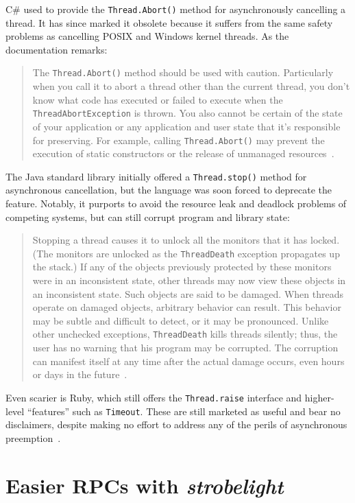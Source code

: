 C\# used to provide the \texttt{Thread.Abort()} method for asynchronously cancelling
a thread.  It has since marked it obsolete because it suffers from the same safety
problems as cancelling POSIX and Windows kernel threads.  As the documentation
remarks:
\begin{quote}
The \texttt{Thread.Abort()} method should be used with caution.  Particularly when
you call it to abort a thread other than the current thread, you don't know what code
has executed or failed to execute when the \texttt{ThreadAbortException} is thrown.
You also cannot be certain of the state of your application or any application and
user state that it's responsible for preserving.  For example, calling
\texttt{Thread.Abort()} may prevent the execution of static constructors or the
release of unmanaged resources~\cite{www-csharp-abort}.
\end{quote}

The Java standard library initially offered a \texttt{Thread.stop()} method for
asynchronous cancellation, but the language was soon forced to deprecate the feature.
Notably, it purports to avoid the resource leak and deadlock problems of competing
systems, but can still corrupt program and library state:
\begin{quote}
Stopping a thread causes it to unlock all the monitors that it has locked.  (The
monitors are unlocked as the \texttt{ThreadDeath} exception propagates up the stack.)
If any of the objects previously protected by these monitors were in an inconsistent
state, other threads may now view these objects in an inconsistent state.  Such
objects are said to be damaged. When threads operate on damaged objects, arbitrary
behavior can result.  This behavior may be subtle and difficult to detect, or it may
be pronounced.  Unlike other unchecked exceptions, \texttt{ThreadDeath} kills threads
silently; thus, the user has no warning that his program may be corrupted.  The
corruption can manifest itself at any time after the actual damage occurs, even hours
or days in the future~\cite{www-java-stop}.
\end{quote}

Even scarier is Ruby, which still offers the \texttt{Thread.raise} interface and
higher-level ``features'' such as \texttt{Timeout}.  These are still marketed as
useful and bear no disclaimers, despite making no effort to address any of the perils
of asynchronous preemption~\cite{www-ruby-danger-terrifying}.


\section{Easier RPCs with \textit{strobelight}}

